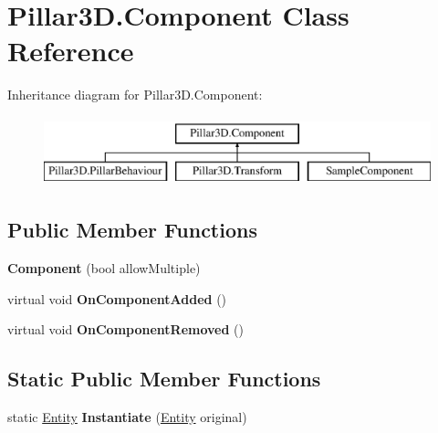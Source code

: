 \hypertarget{class_pillar3_d_1_1_component}{}\section{Pillar3\+D.\+Component Class Reference}
\label{class_pillar3_d_1_1_component}
Inheritance diagram for Pillar3\+D.\+Component\+:\begin{figure}[H]
\begin{center}
\leavevmode
\includegraphics[height=2.000000cm]{class_pillar3_d_1_1_component}
\end{center}
\end{figure}
\subsection*{Public Member Functions}
\begin{DoxyCompactItemize}
\item 
\mbox{\label{class_pillar3_d_1_1_component_a7e21ae60e959d9701de58ccf74bcc3b8}} 
{\bfseries Component} (bool allow\+Multiple)
\item 
\mbox{\label{class_pillar3_d_1_1_component_ad275df027f1fd65d5d0a62ee82767985}} 
virtual void {\bfseries On\+Component\+Added} ()
\item 
\mbox{\label{class_pillar3_d_1_1_component_a4efd313fb7d9b3c757a97152cb2b1f4d}} 
virtual void {\bfseries On\+Component\+Removed} ()
\end{DoxyCompactItemize}
\subsection*{Static Public Member Functions}
\begin{DoxyCompactItemize}
\item 
\mbox{\label{class_pillar3_d_1_1_component_a5c2a2ae3aeb34d2ed0e07651d4829692}} 
static \hyperlink{class_pillar3_d_1_1_entity}{Entity} {\bfseries Instantiate} (\hyperlink{class_pillar3_d_1_1_entity}{Entity} original)
\end{DoxyCompactItemize}
